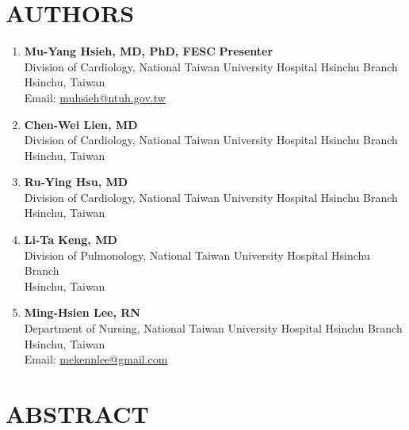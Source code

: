 \documentclass[11pt,a4paper]{article}
\begin{document}
\section*{AUTHORS}

\begin{enumerate}[leftmargin=2em, itemsep=0.8em]
    \item \textbf{Mu-Yang Hsieh, MD, PhD, FESC} \hfill \colorbox{success!20}{\small\textcolor{success}{\textbf{Presenter}}}\\
    {\small Division of Cardiology, National Taiwan University Hospital Hsinchu Branch\\
    Hsinchu, Taiwan\\
    Email: \href{mailto:muhsieh@ntuh.gov.tw}{muhsieh@ntuh.gov.tw}}

    \item \textbf{Chen-Wei Lien, MD}\\
    {\small Division of Cardiology, National Taiwan University Hospital Hsinchu Branch\\
    Hsinchu, Taiwan}

    \item \textbf{Ru-Ying Hsu, MD}\\
    {\small Division of Cardiology, National Taiwan University Hospital Hsinchu Branch\\
    Hsinchu, Taiwan}

    \item \textbf{Li-Ta Keng, MD}\\
    {\small Division of Pulmonology, National Taiwan University Hospital Hsinchu Branch\\
    Hsinchu, Taiwan}

    \item \textbf{Ming-Hsien Lee, RN}\\
    {\small Department of Nursing, National Taiwan University Hospital Hsinchu Branch\\
    Hsinchu, Taiwan\\
    Email: \href{mailto:mekennlee@gmail.com}{mekennlee@gmail.com}}
\end{enumerate}

\vspace{1.5em}

\section*{ABSTRACT}
\end{document}
